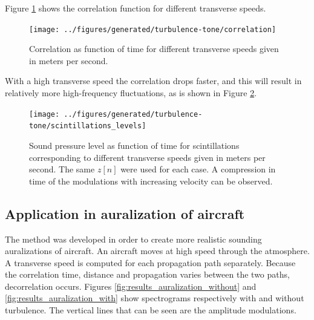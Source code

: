 Figure \ref{fig:results_scintillations_correlation} shows the correlation function for
different transverse speeds.
\begin{figure}[H]
  \centering
  \texttt{[image: ../figures/generated/turbulence-tone/correlation]}
  \caption{Correlation as function of time for different transverse speeds given in meters per second.}
  \label{fig:results_scintillations_correlation}
\end{figure}
With a high transverse speed the correlation drops
faster, and this will result in relatively more high-frequency fluctuations, as is shown in Figure \ref{fig:results_scintillations_levels}.
\begin{figure}[H]
  \centering
  \texttt{[image: ../figures/generated/turbulence-tone/scintillations\_levels]}
  \caption{Sound pressure level as function of time for scintillations
corresponding to different transverse speeds given in meters per second. The
same $z[n]$ were used for each case. A compression in time of the modulations with increasing velocity can be observed.}
  \label{fig:results_scintillations_levels}
\end{figure}


\subsection{Application in auralization of aircraft}
The method was developed in order to create more realistic sounding
auralizations of aircraft. An aircraft moves at high speed through the
atmosphere. A transverse speed is computed for each propagation path separately.
Because the correlation time, distance and propagation varies between the two
paths, decorrelation occurs. Figures \ref{fig:results_auralization_without} and
\ref{fig:results_auralization_with} show spectrograms respectively with and
without turbulence. The vertical lines that can be seen are the amplitude
modulations.

